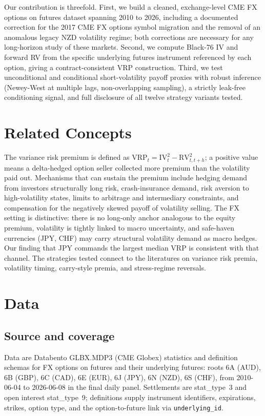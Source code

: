 \documentclass[10pt,twocolumn]{article}
\begin{document}
Our contribution is threefold. First, we build a cleaned, exchange-level CME FX options on futures dataset spanning 2010 to 2026, including a documented correction for the 2017 CME FX options symbol migration and the removal of an anomalous legacy NZD volatility regime; both corrections are necessary for any long-horizon study of these markets. Second, we compute Black-76 IV and forward RV from the specific underlying futures instrument referenced by each option, giving a contract-consistent VRP construction. Third, we test unconditional and conditional short-volatility payoff proxies with robust inference (Newey-West at multiple lags, non-overlapping sampling), a strictly leak-free conditioning signal, and full disclosure of all twelve strategy variants tested.

\section{Related Concepts}
The variance risk premium is defined as $\mathrm{VRP}_t = \mathrm{IV}_t^2 - \mathrm{RV}_{t,t+h}^2$; a positive value means a delta-hedged option seller collected more premium than the volatility paid out. Mechanisms that can sustain the premium include hedging demand from investors structurally long risk, crash-insurance demand, risk aversion to high-volatility states, limits to arbitrage and intermediary constraints, and compensation for the negatively skewed payoff of volatility selling. The FX setting is distinctive: there is no long-only anchor analogous to the equity premium, volatility is tightly linked to macro uncertainty, and safe-haven currencies (JPY, CHF) may carry structural volatility demand as macro hedges. Our finding that JPY commands the largest median VRP is consistent with that channel. The strategies tested connect to the literatures on variance risk premia, volatility timing, carry-style premia, and stress-regime reversals.

\section{Data}
\subsection{Source and coverage}
Data are Databento GLBX.MDP3 (CME Globex) statistics and definition schemas for FX options on futures and their underlying futures: roots 6A (AUD), 6B (GBP), 6C (CAD), 6E (EUR), 6J (JPY), 6N (NZD), 6S (CHF), from 2010-06-04 to 2026-06-08 in the final daily panel. Settlements are stat\_type~3 and open interest stat\_type~9; definitions supply instrument identifiers, expirations, strikes, option type, and the option-to-future link via \texttt{underlying\_id}.
\end{document}
